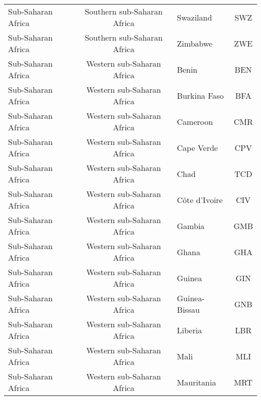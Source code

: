 \begin{landscape}
\begin{longtable}{|p{6cm}|c|p{5cm}|c|}
                               Sub-Saharan Africa &  Southern sub-Saharan Africa &                                         Swaziland &  SWZ \\
                               Sub-Saharan Africa &  Southern sub-Saharan Africa &                                          Zimbabwe &  ZWE \\
                               Sub-Saharan Africa &   Western sub-Saharan Africa &                                             Benin &  BEN \\
                               Sub-Saharan Africa &   Western sub-Saharan Africa &                                      Burkina Faso &  BFA \\
                               Sub-Saharan Africa &   Western sub-Saharan Africa &                                          Cameroon &  CMR \\
                               Sub-Saharan Africa &   Western sub-Saharan Africa &                                        Cape Verde &  CPV \\
                               Sub-Saharan Africa &   Western sub-Saharan Africa &                                              Chad &  TCD \\
                               Sub-Saharan Africa &   Western sub-Saharan Africa &                                   C\^ote d'Ivoire &  CIV \\
                               Sub-Saharan Africa &   Western sub-Saharan Africa &                                            Gambia &  GMB \\
                               Sub-Saharan Africa &   Western sub-Saharan Africa &                                             Ghana &  GHA \\
                               Sub-Saharan Africa &   Western sub-Saharan Africa &                                            Guinea &  GIN \\
                               Sub-Saharan Africa &   Western sub-Saharan Africa &                                     Guinea-Bissau &  GNB \\
                               Sub-Saharan Africa &   Western sub-Saharan Africa &                                           Liberia &  LBR \\
                               Sub-Saharan Africa &   Western sub-Saharan Africa &                                              Mali &  MLI \\
                               Sub-Saharan Africa &   Western sub-Saharan Africa &                                        Mauritania &  MRT \\

\end{longtable}
\end{landscape}
